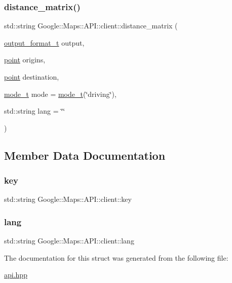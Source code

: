\subsubsection{\texorpdfstring{distance\+\_\+matrix()}{distance\_matrix()}}
{\footnotesize\ttfamily std\+::string Google\+::\+Maps\+::\+A\+P\+I\+::client\+::distance\+\_\+matrix (\begin{DoxyParamCaption}\item[{\hyperlink{a00048}{output\+\_\+format\+\_\+t}}]{output,  }\item[{\hyperlink{a00052}{point}}]{origins,  }\item[{\hyperlink{a00052}{point}}]{destination,  }\item[{\hyperlink{a00044}{mode\+\_\+t}}]{mode = {\ttfamily \hyperlink{a00044}{mode\+\_\+t}(\char`\"{}driving\char`\"{})},  }\item[{std\+::string}]{lang = {\ttfamily \char`\"{}\char`\"{}} }\end{DoxyParamCaption})\hspace{0.3cm}{\ttfamily [inline]}}



\subsection{Member Data Documentation}
\mbox{\label{a00040_a81829bbeb30b8931e2929a3d9815045b}} 
\subsubsection{\texorpdfstring{key}{key}}
{\footnotesize\ttfamily std\+::string Google\+::\+Maps\+::\+A\+P\+I\+::client\+::key\hspace{0.3cm}{\ttfamily [private]}}

\mbox{\label{a00040_a4854d3b172e3e823b647897fe8b24f44}} 
\subsubsection{\texorpdfstring{lang}{lang}}
{\footnotesize\ttfamily std\+::string Google\+::\+Maps\+::\+A\+P\+I\+::client\+::lang\hspace{0.3cm}{\ttfamily [private]}}



The documentation for this struct was generated from the following file\+:\begin{DoxyCompactItemize}
\item 
\hyperlink{a00005}{api.\+hpp}\end{DoxyCompactItemize}
